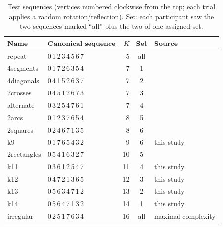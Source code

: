 \documentclass[11pt,a4paper]{article}
\begin{document}
\begin{table}[t]\centering\small
\caption{Test sequences (vertices numbered clockwise from the top; each trial applies a random rotation/reflection). Set: each
participant saw the two sequences marked ``all'' plus the two of one assigned set.}\label{tab:stimuli}
\begin{tabular}{llrcl}\toprule
Name & Canonical sequence & $K$ & Set & Source \\ \midrule
repeat & 0\,1\,2\,3\,4\,5\,6\,7 & 5 & all & \citet{amalric2017language} \\
4segments & 0\,1\,7\,2\,6\,3\,5\,4 & 7 & 1 & \citet{amalric2017language} \\
4diagonals & 0\,4\,1\,5\,2\,6\,3\,7 & 7 & 2 & \citet{amalric2017language} \\
2crosses & 0\,4\,5\,1\,2\,6\,7\,3 & 7 & 3 & \citet{amalric2017language} \\
alternate & 0\,3\,2\,5\,4\,7\,6\,1 & 7 & 4 & \citet{alroumi2021mental} \\
2arcs & 0\,1\,2\,3\,7\,6\,5\,4 & 8 & 5 & \citet{amalric2017language} \\
2squares & 0\,2\,4\,6\,7\,1\,3\,5 & 8 & 6 & \citet{amalric2017language} \\
k9 & 0\,1\,7\,6\,5\,4\,3\,2 & 9 & 6 & this study \\
2rectangles & 0\,5\,4\,1\,6\,3\,2\,7 & 10 & 5 & \citet{amalric2017language} \\
k11 & 0\,3\,6\,1\,2\,5\,4\,7 & 11 & 4 & this study \\
k12 & 0\,4\,7\,2\,1\,3\,6\,5 & 12 & 3 & this study \\
k13 & 0\,5\,6\,3\,4\,7\,1\,2 & 13 & 2 & this study \\
k14 & 0\,5\,6\,4\,7\,1\,3\,2 & 14 & 1 & this study \\
irregular & 0\,2\,5\,1\,7\,6\,3\,4 & 16 & all & maximal complexity \\ \bottomrule
\end{tabular}
\end{table}
\end{document}
